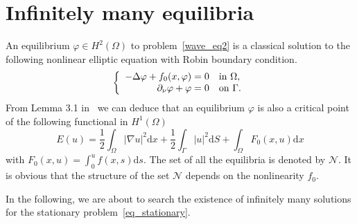 \documentclass{elsarticle}
\begin{document}
\section{Infinitely many equilibria}
\label{sec:stationary}

An equilibrium $\varphi\in H^{2}(\Omega)$ to problem~\eqref{wave_eq2} is a classical solution to the following nonlinear elliptic equation with Robin boundary condition.
\begin{equation}\label{eq_stationary}
\left
    \{
        \begin{array}{rl}
            - \Delta \varphi +f_0(x, \varphi) = 0 &\textrm{in $ \Omega$,} \\
                 \partial_{\nu} \varphi + \varphi= 0 &\textrm{on $\Gamma$.}
        \end{array}
\right.
\end{equation}
From Lemma 3.1 in~\cite{Hao2006} we can deduce that an equilibrium $\varphi$ is also a critical point of the following functional in $H^{1}(\Omega)$
\[
	E(u) = \frac{1}{2}\int_{\Omega}|\nabla u|^2 \mathrm{d}x +  \frac{1}{2}\int_{\Gamma}|u|^2\mathrm{d}S + \int_{\Omega}F_0(x, u)\mathrm{d}x
\]
with $F_0(x, u) = \int_{0}^{u}f(x, s)\mathrm{d}s$.
The set of all the equilibria is denoted by $\mathcal{N}$. 
It is obvious that the structure of the set $\mathcal{N}$ depends on the nonlinearity $f_0$. 


In the following, we are about to search the existence of infinitely many solutions for the stationary problem~\eqref{eq_stationary}.
\end{document}
